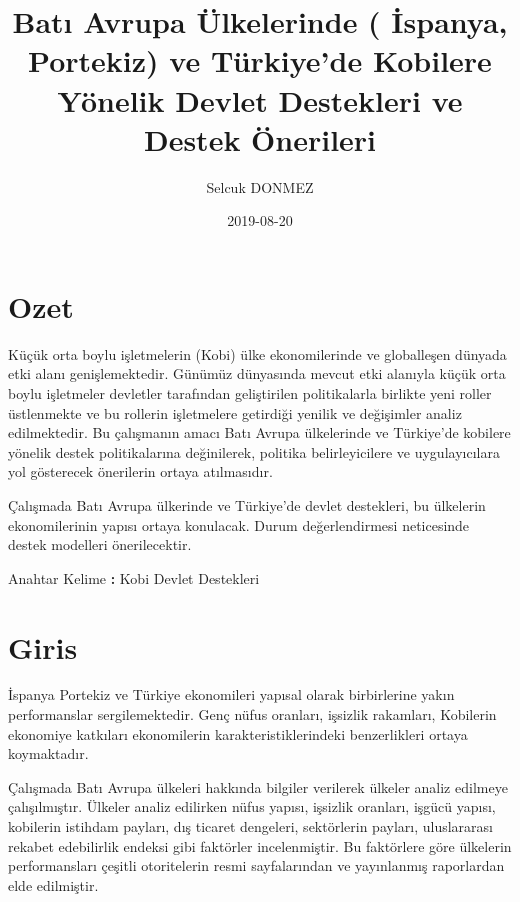 \documentclass[]{book}
\title{Batı Avrupa Ülkelerinde ( İspanya, Portekiz) ve Türkiye'de Kobilere Yönelik Devlet Destekleri ve Destek Önerileri}
\author{Selcuk DONMEZ}
\date{2019-08-20}
\newenvironment{Shaded}{\begin{snugshade}}{\end{snugshade}}
\newcommand{\NormalTok}[1]{#1}
\newcommand{\OperatorTok}[1]{\textcolor[rgb]{0.81,0.36,0.00}{\textbf{#1}}}
\begin{document}
\maketitle

{
\setcounter{tocdepth}{1}
\tableofcontents
}
\hypertarget{ozet}{%
\chapter{Ozet}\label{ozet}}

Küçük orta boylu işletmelerin (Kobi) ülke ekonomilerinde ve globalleşen dünyada etki alanı genişlemektedir. Günümüz dünyasında mevcut etki alanıyla küçük orta boylu işletmeler devletler tarafından geliştirilen politikalarla birlikte yeni roller üstlenmekte ve bu rollerin işletmelere getirdiği yenilik ve değişimler analiz edilmektedir. Bu çalışmanın amacı Batı Avrupa ülkelerinde ve Türkiye'de kobilere yönelik destek politikalarına değinilerek, politika belirleyicilere ve uygulayıcılara yol gösterecek önerilerin ortaya atılmasıdır.

Çalışmada Batı Avrupa ülkerinde ve Türkiye'de devlet destekleri, bu ülkelerin ekonomilerinin yapısı ortaya konulacak. Durum değerlendirmesi neticesinde destek modelleri önerilecektir.

\begin{Shaded}
\begin{Highlighting}[]
\NormalTok{Anahtar Kelime }\OperatorTok{:}
\NormalTok{Kobi}
\NormalTok{Devlet Destekleri}
\end{Highlighting}
\end{Shaded}

\hypertarget{intro}{%
\chapter{Giris}\label{intro}}

İspanya Portekiz ve Türkiye ekonomileri yapısal olarak birbirlerine yakın performanslar sergilemektedir. Genç nüfus oranları, işsizlik rakamları, Kobilerin ekonomiye katkıları ekonomilerin karakteristiklerindeki benzerlikleri ortaya koymaktadır.

Çalışmada Batı Avrupa ülkeleri hakkında bilgiler verilerek ülkeler analiz edilmeye çalışılmıştır. Ülkeler analiz edilirken nüfus yapısı, işsizlik oranları, işgücü yapısı, kobilerin istihdam payları, dış ticaret dengeleri, sektörlerin payları, uluslararası rekabet edebilirlik endeksi gibi faktörler incelenmiştir. Bu faktörlere göre ülkelerin performansları çeşitli otoritelerin resmi sayfalarından ve yayınlanmış raporlardan elde edilmiştir.
\end{document}
